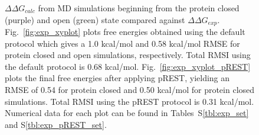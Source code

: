 \documentclass[journal=jctcce,manuscript=article]{achemso}
\begin{document}
\begin{figure}[!ht]
\begin{subfigure}{.5\textwidth}
\end{subfigure}\hfill
\caption{$\Delta\Delta G_{calc}$ from MD simulations beginning from the protein closed (purple) and open (green) state compared against $\Delta\Delta G_{exp}$. 
Fig.~\ref{fig:exp_xyplot} plots free energies obtained using the default protocol which gives a 1.0 kcal/mol and 0.58 kcal/mol RMSE for protein closed and open simulations, respectively.
Total RMSI using the default protocol is 0.68 kcal/mol. 
Fig.~\ref{fig:exp_xyplot_pREST} plots the final free energies after applying pREST, yielding an RMSE of 0.54 for protein closed and 0.50 kcal/mol for protein closed simulations.
Total RMSI using the pREST protocol is 0.31 kcal/mol.
Numerical data for each plot can be found in Tables~S\ref{tbl:exp_set} and S\ref{tbl:exp_pREST_set}.
} 
\label{fig:exp-xyplots}
\end{figure}
\end{document}
